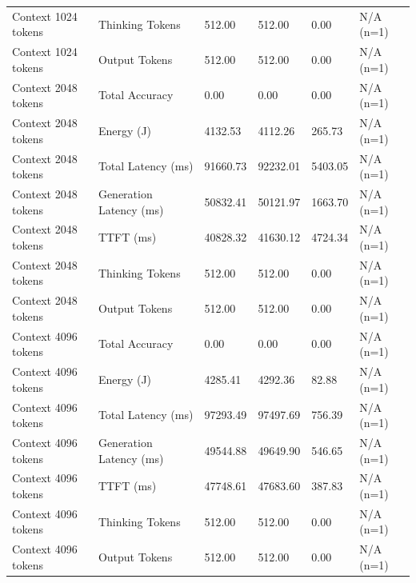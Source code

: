 \begin{table}
\begin{tabular}{llllll}
Context 1024 tokens & Thinking Tokens & 512.00 & 512.00 & 0.00 & N/A (n=1) \\
Context 1024 tokens & Output Tokens & 512.00 & 512.00 & 0.00 & N/A (n=1) \\
Context 2048 tokens & Total Accuracy & 0.00 & 0.00 & 0.00 & N/A (n=1) \\
Context 2048 tokens & Energy (J) & 4132.53 & 4112.26 & 265.73 & N/A (n=1) \\
Context 2048 tokens & Total Latency (ms) & 91660.73 & 92232.01 & 5403.05 & N/A (n=1) \\
Context 2048 tokens & Generation Latency (ms) & 50832.41 & 50121.97 & 1663.70 & N/A (n=1) \\
Context 2048 tokens & TTFT (ms) & 40828.32 & 41630.12 & 4724.34 & N/A (n=1) \\
Context 2048 tokens & Thinking Tokens & 512.00 & 512.00 & 0.00 & N/A (n=1) \\
Context 2048 tokens & Output Tokens & 512.00 & 512.00 & 0.00 & N/A (n=1) \\
Context 4096 tokens & Total Accuracy & 0.00 & 0.00 & 0.00 & N/A (n=1) \\
Context 4096 tokens & Energy (J) & 4285.41 & 4292.36 & 82.88 & N/A (n=1) \\
Context 4096 tokens & Total Latency (ms) & 97293.49 & 97497.69 & 756.39 & N/A (n=1) \\
Context 4096 tokens & Generation Latency (ms) & 49544.88 & 49649.90 & 546.65 & N/A (n=1) \\
Context 4096 tokens & TTFT (ms) & 47748.61 & 47683.60 & 387.83 & N/A (n=1) \\
Context 4096 tokens & Thinking Tokens & 512.00 & 512.00 & 0.00 & N/A (n=1) \\
Context 4096 tokens & Output Tokens & 512.00 & 512.00 & 0.00 & N/A (n=1) \\
\bottomrule
\end{tabular}
\end{table}
